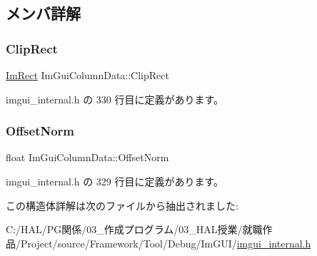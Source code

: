 \subsection{メンバ詳解}
\mbox{\label{struct_im_gui_column_data_aeccf8bbbd380fdd9d3350b5aac95ad34}} 
\subsubsection{\texorpdfstring{Clip\+Rect}{ClipRect}}
{\footnotesize\ttfamily \mbox{\hyperlink{struct_im_rect}{Im\+Rect}} Im\+Gui\+Column\+Data\+::\+Clip\+Rect}



 imgui\+\_\+internal.\+h の 330 行目に定義があります。

\mbox{\label{struct_im_gui_column_data_a9678a00f55c9fa44ed35ec14ea9b697b}} 
\subsubsection{\texorpdfstring{Offset\+Norm}{OffsetNorm}}
{\footnotesize\ttfamily float Im\+Gui\+Column\+Data\+::\+Offset\+Norm}



 imgui\+\_\+internal.\+h の 329 行目に定義があります。



この構造体詳解は次のファイルから抽出されました\+:\begin{DoxyCompactItemize}
\item 
C\+:/\+H\+A\+L/\+P\+G関係/03\+\_\+作成プログラム/03\+\_\+\+H\+A\+L授業/就職作品/\+Project/source/\+Framework/\+Tool/\+Debug/\+Im\+G\+U\+I/\mbox{\hyperlink{imgui__internal_8h}{imgui\+\_\+internal.\+h}}\end{DoxyCompactItemize}
